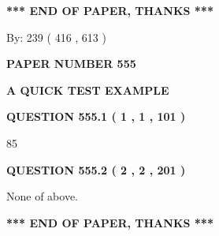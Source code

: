 \documentclass[12pt]{article}
\begin{document}
 
 
 
   
   
 \vspace{0.2in}
 
   
   
   
   
\vspace{1.0in} 
{\textbf{\large{ *** END OF PAPER, THANKS *** }}} 
   
   
\hspace{1.0in} By: 
 239 ( 416 ,  613 )
   
   
   
   
\newpage 
\setcounter{page}{ 
   555001 } 
   
   
   
   
 {\textbf{ \Large{ PAPER NUMBER  555  }}}
   
   
\vspace{0.2in}
   
   
   
   
   
   
 \vspace{0.2in}
{\LARGE {\textbf{ A QUICK TEST EXAMPLE}}}
   
   
  
\vspace{0.2in}
  
{\textbf{\Large{QUESTION
555.1 
 ( 1 , 1 , 101 )
}}}
  
  
 
 
\noindent{}

85
 
 
  
\vspace{0.2in}
  
{\textbf{\Large{QUESTION
555.2 
 ( 2 , 2 , 201 )
}}}
  
  
 
 
\noindent{}
 
 
 None of above.
 
 
 
 
   
   
 \vspace{0.2in}
 
   
   
   
   
\vspace{1.0in} 
{\textbf{\large{ *** END OF PAPER, THANKS *** }}} 
   
\end{document}
